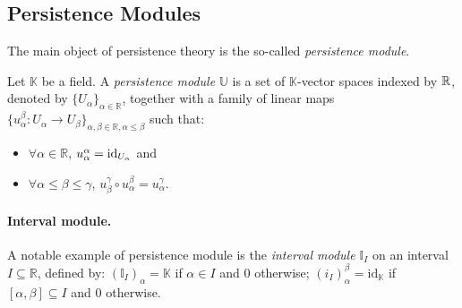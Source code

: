  


\subsection{Persistence Modules}\label{sec:modules}
The main object of persistence theory is the so-called {\em persistence module}.

\begin{defin} 
Let $\mathbb{K}$ be a field.
A {\em persistence module} $\mathbb{U}$ is a set of $\mathbb{K}$-vector spaces indexed by $\mathbb{R}$, denoted by 
$\{U_{\alpha}\}_{\alpha\in\mathbb{R}}$, together with a family of linear maps $\{u_{\alpha}^{\beta}:U_{\alpha}\rightarrow 
U_{\beta}\}_{\alpha,\beta\in\mathbb{R},\alpha\leq\beta}$ such that:
\begin{itemize}
\item  $\forall\alpha\in\mathbb{R}$, $u_{\alpha}^{\alpha}={\rm id}_{U_{\alpha}}$ and
\item  $\forall \alpha\leq\beta\leq\gamma$, $u_{\beta}^{\gamma}\circ u_{\alpha}^{\beta}=u_{\alpha}^{\gamma}.$ 
\end{itemize}
\end{defin}

\paragraph*{Interval module.}
A notable example of persistence module is the {\em interval module $\mathbb{I}_{I}$} on an interval $I\subseteq \mathbb{R}$, 
defined by: $(\mathbb{I}_{I})_{\alpha}=\mathbb{K}$ if $\alpha\in I$ and $0$ otherwise;  
$(i_{I})_{\alpha}^{\beta}=\text{id}_{\mathbb{K}}$ if $[\alpha,\beta]\subseteq I$ and $0$ otherwise.

